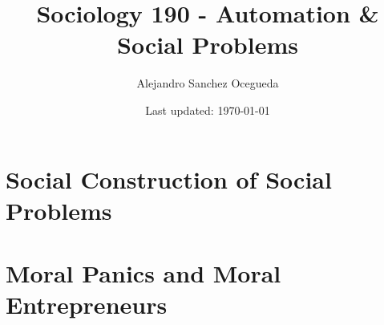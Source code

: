 \documentclass[openany]{book}
\title{Sociology 190 - Automation \& Social Problems}
\author{Alejandro Sanchez Ocegueda}
\date{Last updated: \today}
\begin{document}
\maketitle

\tableofcontents

\chapter{Social Construction of Social Problems}


\chapter{Moral Panics and Moral Entrepreneurs}

\end{document}
